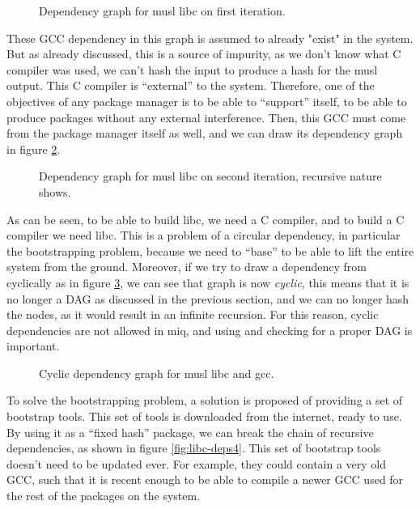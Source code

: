 \begin{figure}[hbt]
    \centerfloat
    
    \caption{Dependency graph for musl libc on first iteration.}
    \label{fig:libc-deps}
\end{figure}

These GCC dependency in this graph is assumed to already
"exist" in the system. But as already discussed, this is a
source of impurity, as we don't know what C compiler was
used, we can't hash the input to produce a hash for the musl
output. This C compiler is ``external'' to the system.
Therefore, one of the objectives of any package manager is to
be able to ``support'' itself, to be able to produce
packages without any external interference. Then, this GCC
must come from the package manager itself as well, and we
can draw its dependency graph in figure \ref{fig:libc-deps2}.

\begin{figure}[hbt]
    \centerfloat
    
    \caption{Dependency graph for musl libc on second iteration, recursive nature shows.}
    \label{fig:libc-deps2}
\end{figure}

As can be seen, to be able to build libc, we need a C
compiler, and to build a C compiler we need libc. This is a
problem of a circular dependency, in particular the
bootstrapping problem, because we need to ``base'' to be
able to lift the entire system from the ground.
Moreover, if we try to draw a dependency from cyclically as
in figure \ref{fig:libc-deps3}, we can see that graph is now
\emph{cyclic}, this means that it is no longer a \ac{DAG} as
discussed in the previous section, and we can no longer hash
the nodes, as it would result in an infinite recursion. For
this reason, cyclic dependencies are not allowed in miq, and
using and checking for a proper \ac{DAG} is important.

\begin{figure}[hbt]
    \centerfloat
    
    \caption{Cyclic dependency graph for musl libc and gcc.}
    \label{fig:libc-deps3}
\end{figure}

To solve the bootstrapping problem, a solution is proposed
of providing a set of bootstrap tools. This set of tools is
downloaded from the internet, ready to use. By using it as a
``fixed hash'' package, we can break the chain of recursive
dependencies, as shown in figure \ref{fig:libc-deps4}. This
set of bootstrap tools doesn't need to be updated ever. For
example, they could contain a very old GCC, such that it is
recent enough to be able to compile a newer GCC used for the
rest of the packages on the system.

